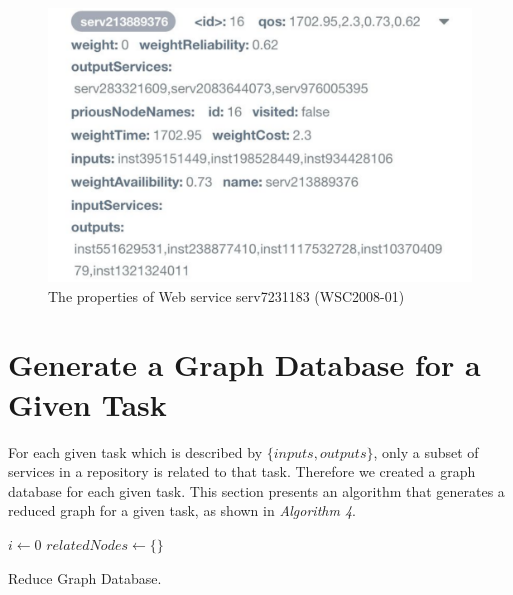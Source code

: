 \begin{figure}[H]
\includegraphics[scale = 0.53]{The-properties-of-Web-service-serv213889376.pdf}
\centering
\caption{The properties of Web service serv7231183 (WSC2008-01)}
\label{fig:servProp} 
\end{figure} 

\section{Generate a Graph Database for a Given Task}
For each given task which is described by $\{inputs, outputs\}$, only a subset of services in a repository is related to that task. Therefore we created a graph database for each given task. This section presents an algorithm that generates a reduced graph for a given task, as shown in \emph{Algorithm 4}. \\

\begin{algorithm}[h]
 \LinesNumbered
 \SetNlSty{}{}{:}
 $i \leftarrow 0$\;
 $relatedNodes \leftarrow \{\}$\;
 \caption{\footnotesize Reduce Graph Database.}
\label{generation}
\end{algorithm}
\setlength{\textfloatsep}{20pt}%

